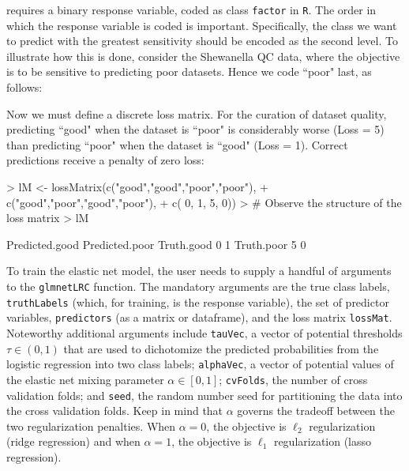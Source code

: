 \documentclass{article}
\begin{document}
 requires a binary response variable, coded
as class {\tt factor} in {\tt R}.  The order in which the response variable
is coded is important.  Specifically, the class we want to predict with
the greatest sensitivity should be encoded as the second level. To illustrate how this
is done, consider the Shewanella QC data, where the objective is to be
sensitive to predicting poor datasets.  Hence we 
code ``poor" last, as follows:
\begin{Schunk}
\end{Schunk}
\noindent Now we must define a discrete loss matrix. For the curation
of dataset quality, predicting ``good" when the dataset is ``poor" is considerably 
worse (Loss = 5) than predicting ``poor" when the dataset
is ``good" (Loss = 1).  Correct predictions receive a penalty of zero loss:

\begin{Schunk}
\begin{Sinput}
> lM <- lossMatrix(c("good","good","poor","poor"),
+                  c("good","poor","good","poor"),
+                  c(     0,     1,     5,     0))
> # Observe the structure of the loss matrix
> lM
\end{Sinput}
\begin{Soutput}
           Predicted.good Predicted.poor
Truth.good              0              1
Truth.poor              5              0
\end{Soutput}
\end{Schunk}

To train the elastic net model, the user needs to supply a handful of arguments to the {\tt glmnetLRC} function. The mandatory arguments are the true class labels, {\tt truthLabels} (which, for training, is the response variable), the set of predictor variables, {\tt predictors} (as a matrix or dataframe),
and the loss matrix {\tt lossMat}. Noteworthy additional arguments include {\tt tauVec}, a vector of potential thresholds $\tau \in (0, 1)$ that are used to dichotomize the predicted probabilities from the logistic regression into two class labels; {\tt alphaVec}, a vector of potential values of the elastic net mixing parameter $\alpha \in [0, 1]$; {\tt cvFolds}, the number of cross validation folds; and {\tt seed}, the random number seed for partitioning the data into the cross validation folds. Keep in mind that $\alpha$ governs the tradeoff between the two regularization penalties. When $\alpha = 0$, the objective is $\ell_2$ regularization (ridge regression) and when $\alpha = 1$, the objective is $\ell_1$ regularization (lasso regression).   
\end{document}
